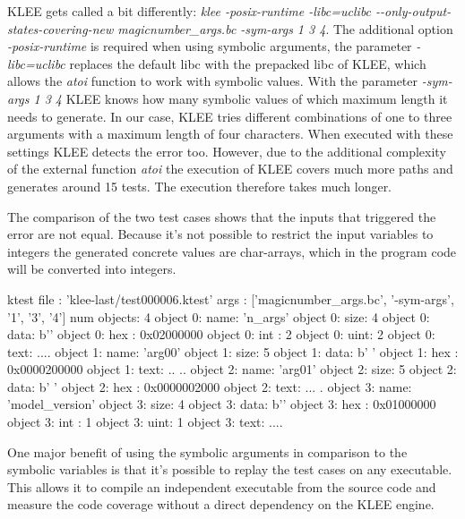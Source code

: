 KLEE gets called a bit differently: \textit{klee -posix-runtime -libc=uclibc -{}-only-output-states-covering-new magicnumber\_args.bc -sym-args 1 3 4}.
The additional option \textit{-posix-runtime} is required when using symbolic arguments, the parameter \textit{-libc=uclibc} replaces the default libc with the prepacked libc of KLEE, which allows the \textit{atoi} function to work with symbolic values.
With the parameter \textit{-sym-args 1 3 4} KLEE knows how many symbolic values of which maximum length it needs to generate. In our case, KLEE tries different combinations of one to three arguments with a maximum length of four characters.
When executed with these settings KLEE detects the error too. However, due to the additional complexity of the external function \textit{atoi} the execution of KLEE covers much more paths and generates around 15 tests. The execution therefore takes much longer.

The comparison of the two test cases shows that the inputs that triggered the error are not equal.
Because it's not possible to restrict the input variables to integers the generated concrete values are char-arrays, which in the program code will be converted into integers.

\begin{codesnippet}[caption={The test case generated by KLEE which triggers the assertion error when executing it on the code snippet \ref{codeSnippet:klee_arguments}}, label={codeSnippet:test_case_two}]
ktest file : 'klee-last/test000006.ktest'
args       : ['magicnumber_args.bc',
              '-sym-args', '1', '3', '4']
num objects: 4
object 0: name: 'n_args'
object 0: size: 4
object 0: data: b''
object 0: hex : 0x02000000
object 0: int : 2
object 0: uint: 2
object 0: text: ....
object 1: name: 'arg00'
object 1: size: 5
object 1: data: b' '
object 1: hex : 0x0000200000
object 1: text: .. ..
object 2: name: 'arg01'
object 2: size: 5
object 2: data: b' '
object 2: hex : 0x0000002000
object 2: text: ... .
object 3: name: 'model_version'
object 3: size: 4
object 3: data: b''
object 3: hex : 0x01000000
object 3: int : 1
object 3: uint: 1
object 3: text: ....
\end{codesnippet}

One major benefit of using the symbolic arguments in comparison to the symbolic variables is that it's possible to replay the test cases on any executable.
This allows it to compile an independent executable from the source code and measure the code coverage without a direct dependency on the KLEE engine.

